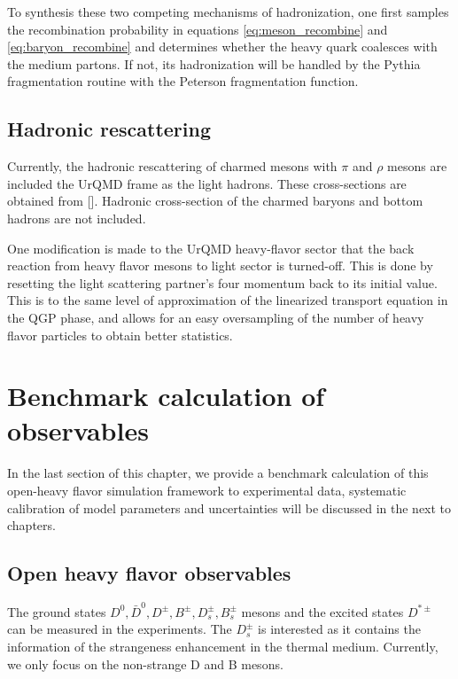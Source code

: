 To synthesis these two competing mechanisms of hadronization, one first samples the recombination probability in equations \ref{eq:meson_recombine} and \ref{eq:baryon_recombine} and determines whether the heavy quark coalesces with the medium partons. 
If not, its hadronization will be handled by the Pythia fragmentation routine with the Peterson fragmentation function.

\subsection{Hadronic rescattering}
Currently, the hadronic rescattering of charmed mesons with $\pi$ and $\rho$ mesons are included the UrQMD frame as the light hadrons. 
These cross-sections are obtained from [].
Hadronic cross-section of the charmed baryons and bottom hadrons are not included.

One modification is made to the UrQMD heavy-flavor sector that the back reaction from heavy flavor mesons to light sector is turned-off. 
This is done by resetting the light scattering partner's four momentum back to its initial value.
This is to the same level of approximation of the linearized transport equation in the QGP phase, and allows for an easy oversampling of the number of heavy flavor particles to obtain better statistics.

\section{Benchmark calculation of observables}
In the last section of this chapter, we provide a benchmark calculation of this open-heavy flavor simulation framework to experimental data, systematic calibration of model parameters and uncertainties will be discussed in the next to chapters.

\subsection{Open heavy flavor observables}
The ground states $D^0, \bar{D}^0, D^{\pm}, B^{\pm}, D_s^{\pm}, B_s^{\pm}$ mesons and the excited states $D^{*\pm}$ can be measured in the experiments.
The $D_s^{\pm}$ is interested as it contains the information of the strangeness enhancement in the thermal medium.
Currently, we only focus on the non-strange D and B mesons.

